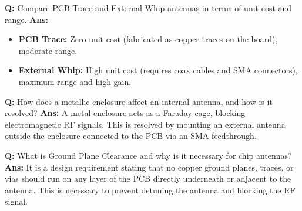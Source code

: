 \documentclass[10pt,a4paper,twocolumn]{article}
\begin{document}
\begin{tcolorbox}[
  colback=white,
  colframe=UnitColorFive,
  colbacktitle=gray!10!white,
  coltitle=black,
  fonttitle=\bfseries\sffamily\small,
  title={Unit V $\bullet$ Card 8},
  boxrule=1.2pt,
  arc=2mm,
  outer arc=2mm,
  boxsep=1.5mm,
  top=1mm,
  bottom=1mm,
  left=1.5mm,
  right=1.5mm,
  before skip=2.5mm,
  after skip=2.5mm
]
\textbf{Q:} Compare PCB Trace and External Whip antennas in terms of unit cost and range.
\tcbline
\textbf{Ans:} \begin{itemize}
  \item \textbf{PCB Trace:} Zero unit cost (fabricated as copper traces on the board), moderate range.
  \item \textbf{External Whip:} High unit cost (requires coax cables and SMA connectors), maximum range and high gain.
\end{itemize}
\end{tcolorbox}


\begin{tcolorbox}[
  colback=white,
  colframe=UnitColorFive,
  colbacktitle=gray!10!white,
  coltitle=black,
  fonttitle=\bfseries\sffamily\small,
  title={Unit V $\bullet$ Card 9},
  boxrule=1.2pt,
  arc=2mm,
  outer arc=2mm,
  boxsep=1.5mm,
  top=1mm,
  bottom=1mm,
  left=1.5mm,
  right=1.5mm,
  before skip=2.5mm,
  after skip=2.5mm
]
\textbf{Q:} How does a metallic enclosure affect an internal antenna, and how is it resolved?
\tcbline
\textbf{Ans:} A metal enclosure acts as a Faraday cage, blocking electromagnetic RF signals. This is resolved by mounting an external antenna outside the enclosure connected to the PCB via an SMA feedthrough.
\end{tcolorbox}


\begin{tcolorbox}[
  colback=white,
  colframe=UnitColorFive,
  colbacktitle=gray!10!white,
  coltitle=black,
  fonttitle=\bfseries\sffamily\small,
  title={Unit V $\bullet$ Card 10},
  boxrule=1.2pt,
  arc=2mm,
  outer arc=2mm,
  boxsep=1.5mm,
  top=1mm,
  bottom=1mm,
  left=1.5mm,
  right=1.5mm,
  before skip=2.5mm,
  after skip=2.5mm
]
\textbf{Q:} What is Ground Plane Clearance and why is it necessary for chip antennas?
\tcbline
\textbf{Ans:} It is a design requirement stating that no copper ground planes, traces, or vias should run on any layer of the PCB directly underneath or adjacent to the antenna. This is necessary to prevent detuning the antenna and blocking the RF signal.
\end{tcolorbox}
\end{document}
